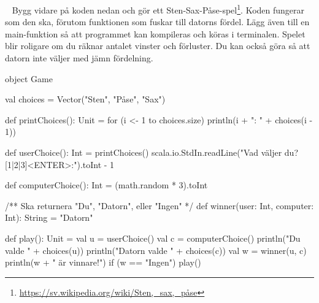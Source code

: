 %
%
%
%
%
%
%
%
%
%
%
%
%
%
%
%
%
%
%
%
%
%
%
%
%
%
%
%
%
%
%
%


\newpage

\AdvancedTasks %





\QUESTBEGIN

\Task  \what~ Bygg vidare på koden nedan och gör ett Sten-Sax-Påse-spel\footnote{\url{https://sv.wikipedia.org/wiki/Sten,_sax,_påse}}. Koden fungerar som den ska, förutom funktionen  som fuskar till datorns fördel. Lägg även till en main-funktion så att programmet kan kompileras och köras i terminalen. Spelet blir roligare om du räknar antalet vinster och förluster. Du kan också göra så att datorn inte väljer med jämn fördelning.

\begin{Code}
object Game {
  val choices = Vector("Sten", "Påse", "Sax")

  def printChoices(): Unit =
    for (i <- 1 to choices.size) println(i + ": " + choices(i - 1))

  def userChoice(): Int = {
    printChoices()
    scala.io.StdIn.readLine("Vad väljer du? [1|2|3]<ENTER>:").toInt - 1
  }

  def computerChoice(): Int = (math.random * 3).toInt

  /** Ska returnera "Du", "Datorn", eller "Ingen" */
  def winner(user: Int, computer: Int): String = "Datorn"

  def play(): Unit = {
    val u = userChoice()
    val c = computerChoice()
    println("Du valde " + choices(u))
    println("Datorn valde " + choices(c))
    val w = winner(u, c)
    println(w + " är vinnare!")
    if (w == "Ingen") play()
  }
}
\end{Code}

